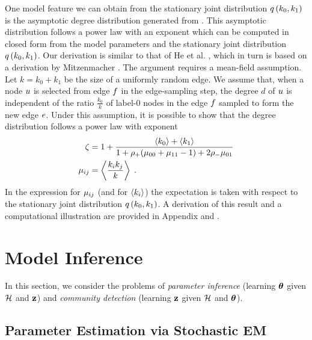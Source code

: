\documentclass[aps,pre,reprint,superscriptaddress,nofootinbib]{revtex4-2}
\begin{document}
    One model feature we can obtain from the stationary joint distribution $q \left( k_0, k_1 \right)$ is the asymptotic degree distribution generated from \model{}.
    This asymptotic distribution follows a power law with an exponent which can be computed in closed form from the model parameters and the stationary joint distribution $q \left( k_0, k_1 \right)$. 
    Our derivation is similar to that of He et al. \cite{heEdgeCorrelationsLink2025}, which in turn is based on a derivation by Mitzenmacher \cite{mitzenmacherBriefHistoryGenerative2004}. 
    The argument requires a mean-field assumption. 
    Let $k = k_0 + k_1$ be the size of a uniformly random edge. 
    We assume that, when a node $u$ is selected from edge $f$ in the edge-sampling step, the degree $d$ of $u$ is independent of the ratio $\frac{k_0}{k}$ of label-0 nodes in the edge $f$ sampled to form the new edge $e$.
    Under this assumption, it is possible to show that the degree distribution follows a power law with exponent
    \begin{align}
        \zeta &= 1 + \frac{\left\langle k_0 \right\rangle + \left\langle k_1 \right\rangle}{1 + \rho{}_+(\mu_{00} + \mu_{11} - 1) + 2\rho{}_- \mu_{01}} \label{eq:power-law-exponent}\\ 
        \mu_{ij} &= \left\langle \frac{k_i k_j}{k} \right\rangle \;. \nonumber
    \end{align}
    In the expression for $\mu_{ij}$ (and for $\left\langle k_i \right\rangle$) the expectation is taken with respect to the stationary joint distribution $q \left( k_0, k_1 \right)$.
    A derivation of this result and a computational illustration are provided in Appendix  and . 
    
\section{Model Inference} \label{sec:inference}

    In this section, we consider the problems of \emph{parameter inference} (learning $\boldsymbol{\theta}$ given $\mathcal{H}$ and $\mathbf{z}$) and \emph{community detection} (learning $\mathbf{z}$ given $\mathcal{H}$ and $\boldsymbol{\theta}$). 


\subsection{Parameter Estimation via Stochastic EM} \label{sec:sem}
\end{document}
